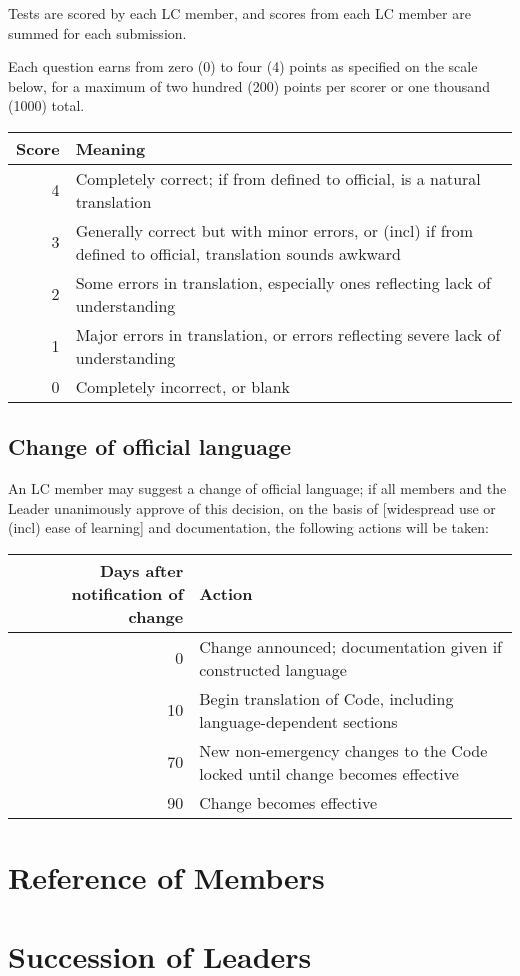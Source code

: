\documentclass[10pt]{book}
\begin{document}
Tests are scored by each LC member, and scores from each LC member are summed for each submission.

Each question earns from zero (0) to four (4) points as specified on the scale below, for a maximum of two hundred (200) points per scorer or one thousand (1000) total.

\begin{tabular}{|r|p{5cm}|}
 \hline
 Score & Meaning \\ \hline
 4 & Completely correct; if from defined to official, is a natural translation \\
 3 & Generally correct but with minor errors, or (incl) if from defined to official, translation sounds awkward \\
 2 & Some errors in translation, especially ones reflecting lack of understanding \\
 1 & Major errors in translation, or errors reflecting severe lack of understanding \\
 0 & Completely incorrect, or blank \\
 \hline
\end{tabular}

\section{Change of official language}

An LC member may suggest a change of official language; if all members and the Leader unanimously approve of this decision, on the basis of [widespread use or (incl) ease of learning] and documentation, the following actions will be taken:

\begin{tabular}{|r|p{5cm}|}
 \hline
 Days after notification of change & Action \\ \hline
 0 & Change announced; documentation given if constructed language \\
 10 & Begin translation of Code, including language-dependent sections \\
 70 & New non-emergency changes to the Code locked until change becomes effective \\
 90 & Change becomes effective \\
 \hline
\end{tabular}

\appendix

\chapter{Reference of Members}



\chapter{Succession of Leaders}


\end{document}
